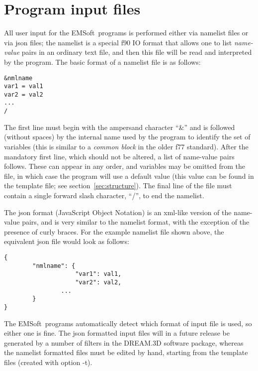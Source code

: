 \documentclass[DIV=calc, paper=letter, fontsize=11pt]{scrartcl}	 %
\newcommand{\ctp}{\textsf{EMSoft}}
\begin{document}
\newpage
\section{Program input files\label{sec:f90input}}
All user input for the \ctp\ programs is performed either via namelist files or via json files; the namelist is a special f90 IO format that allows one to list 
\textit{name-value} pairs in an ordinary text file, and then this file will be read and interpreted by the 
program.  The basic format of a namelist file is as follows:
\begin{verbatim}
&nmlname
var1 = val1
var2 = val2
...
/
\end{verbatim}
The first line must begin with the ampersand character ``\&'' and is followed (without spaces) by the internal name used by the program 
to identify the set of variables (this is similar to a \textit{common block} in the older f77 standard).  After the mandatory first line, which should not be altered, a 
list of name-value pairs follows.  These can appear in any order, and variables may be omitted from the file, in which case the program
will use a default value (this value can be found in the template file; see section~\ref{sec:structure}).  The final line of the file must contain a single forward slash
character, ``/'', to end the namelist.

The json format (JavaScript Object Notation) is an xml-like version of the name-value pairs, and is very similar to the namelist format, with the exception 
of the presence of curly braces.  For the example namelist file shown above, the equivalent json file would look as follows:
\begin{verbatim}
{
        "nmlname": {
        	        "var1": val1,
        	        "var2": val2,
                ...		
        }
}
\end{verbatim}
The \ctp\ programs automatically detect which format of input file is used, so either one is fine.  The json formatted input files 
will in a future release be generated by a number of filters in the \textsf{DREAM.3D} software package, whereas the namelist formatted 
files must be edited by hand, starting from the template files (created with option -t).\\
\end{document}
